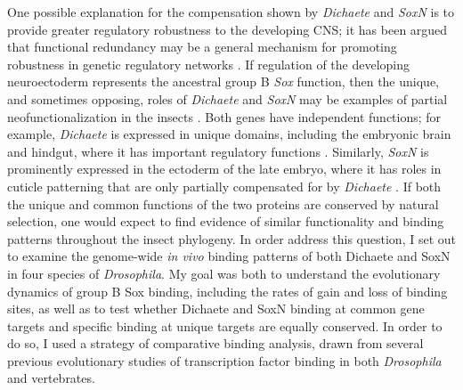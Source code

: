 One possible explanation for the compensation shown by \emph{Dichaete} and \emph{SoxN} is to provide greater regulatory robustness to the developing CNS; it has been argued that functional redundancy may be a general mechanism for promoting robustness in genetic regulatory networks  \citep{nowak_evolution_1997,tautz_redundancies_1992,wagner_distributed_2005,wagner_gene_2008}. If regulation of the developing neuroectoderm represents the ancestral group B \emph{Sox} function, then the unique, and sometimes opposing, roles of \emph{Dichaete} and \emph{SoxN} may be examples of partial neofunctionalization in the insects \citep{ferrero_soxneuro_2014}. Both genes have independent functions; for example, \emph{Dichaete} is expressed in unique domains, including the embryonic brain and hindgut, where it has important regulatory functions \citep{sanchez-soriano_regulatory_2000}. Similarly, \emph{SoxN} is prominently expressed in the ectoderm of the late embryo, where it has roles in cuticle patterning that are only partially compensated for by \emph{Dichaete} \citep{overton_drosophila_2007}. If both the unique and common functions of the two proteins are conserved by natural selection, one would expect to find evidence of similar functionality and binding patterns throughout the insect phylogeny. In order address this question, I set out to examine the genome-wide \emph{in vivo} binding patterns of both Dichaete and SoxN in four species of \emph{Drosophila}. My goal was both to understand the evolutionary dynamics of group B Sox binding, including the rates of gain and loss of binding sites, as well as to test whether Dichaete and SoxN binding at common gene targets and specific binding at unique targets are equally conserved. In order to do so, I used a strategy of comparative binding analysis, drawn from several previous evolutionary studies of transcription factor binding in both \emph{Drosophila} and vertebrates.


